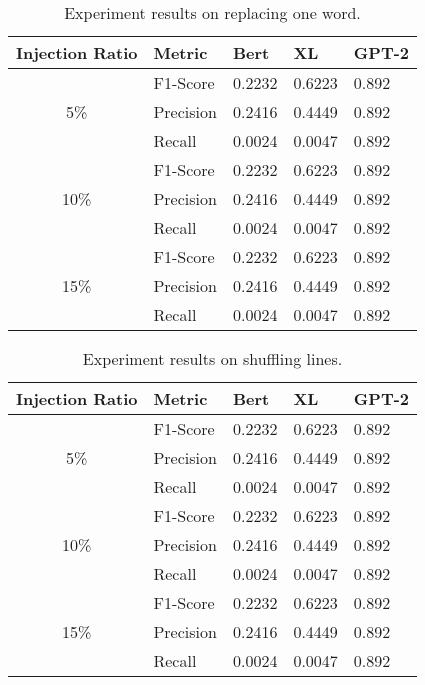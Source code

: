 \begin{appendix}
\begin{table}
\centering
\begin{tabular}{ c l l l l }
\toprule
Injection Ratio & Metric & Bert & XL & GPT-2\\
\midrule
     & F1-Score & 0.2232 & 0.6223 & 0.892\\
5\%  & Precision & 0.2416 & 0.4449 & 0.892\\
     & Recall & 0.0024 & 0.0047 & 0.892\\ 
\midrule
     & F1-Score & 0.2232 & 0.6223 & 0.892\\
10\% & Precision & 0.2416 & 0.4449 & 0.892\\
     & Recall & 0.0024 & 0.0047 & 0.892\\ 
\midrule
     & F1-Score & 0.2232 & 0.6223 & 0.892\\
15\% & Precision & 0.2416 & 0.4449 & 0.892\\
     & Recall & 0.0024 & 0.0047 & 0.892\\ 
\bottomrule
\end{tabular}
\caption{Experiment results on replacing one word.}
\end{table}



\begin{table}
\centering
\begin{tabular}{ c l l l l }
\toprule
Injection Ratio & Metric & Bert & XL & GPT-2\\
\midrule
     & F1-Score & 0.2232 & 0.6223 & 0.892\\
5\%  & Precision & 0.2416 & 0.4449 & 0.892\\
     & Recall & 0.0024 & 0.0047 & 0.892\\ 
\midrule
     & F1-Score & 0.2232 & 0.6223 & 0.892\\
10\% & Precision & 0.2416 & 0.4449 & 0.892\\
     & Recall & 0.0024 & 0.0047 & 0.892\\ 
\midrule
     & F1-Score & 0.2232 & 0.6223 & 0.892\\
15\% & Precision & 0.2416 & 0.4449 & 0.892\\
     & Recall & 0.0024 & 0.0047 & 0.892\\ 
\bottomrule
\end{tabular}
\caption{Experiment results on shuffling lines.}
\end{table}




\end{appendix}
